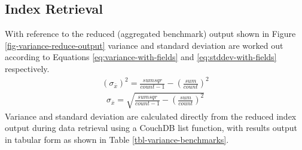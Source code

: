 

\subsection{Index Retrieval}
With reference to the reduced (aggregated benchmark) output shown in Figure \ref{fig-variance-reduce-output} variance and standard deviation are worked out according to Equations \ref{eq:variance-with-fields} and \ref{eq:stddev-with-fields} respectively.
\begin{align}
  (\sigma_{\overline{x}})^{2} = \frac{sumsqr}{count-1} - (\frac{sum}{count})^{2}\label{eq:variance-with-fields}
\end{align}
\begin{align}
  \sigma_{\overline{x}} = \sqrt{\frac{sumsqr}{count-1} - (\frac{sum}{count})^{2}}\label{eq:stddev-with-fields}
\end{align}
Variance and standard deviation are calculated directly from the reduced index output during data retrieval using a CouchDB list function, with results output in tabular form as shown in Table \ref{tbl-variance-benchmarks}.

